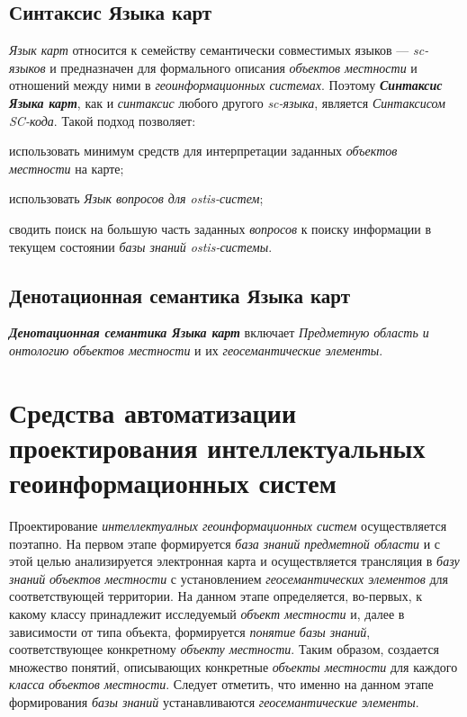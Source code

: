 \subsection{Синтаксис Языка карт}
\label{chapter_gis_sec_map_syntax}

\textit{Язык карт} относится к семейству семантически совместимых языков --- \textit{sc-языков} и предназначен для формального описания \textit{объектов местности} и отношений между ними в \textit{геоинформационных системах}. Поэтому \textbf{\textit{Синтаксис Языка карт}}, как и \textit{синтаксис} любого другого \textit{sc-языка}, является \textit{Синтаксисом SC-кода}. Такой подход позволяет:
\begin{textitemize}
\item использовать минимум средств для интерпретации заданных \textit{объектов местности} на карте;
\item использовать \textit{Язык вопросов для ostis-систем};
\item сводить поиск на большую часть заданных \textit{вопросов} к поиску информации в текущем состоянии \textit{базы знаний ostis-системы}.
\end{textitemize}

\subsection{Денотационная семантика Языка карт}
\label{chapter_gis_sec_map_semantics}

\textbf{\textit{Денотационная семантика Языка карт}} включает \textit{Предметную область и онтологию объектов местности} и их \textit{геосемантические элементы}.

\section{Средства автоматизации проектирования интеллектуальных геоинформационных систем}
\label{chapter_gis_sec_automatization}

Проектирование \textit{интеллектуалных геоинформационных систем} осуществляется поэтапно. На первом этапе формируется \textit{база знаний} \textit{предметной области} и с этой целью анализируется электронная карта и осуществляется трансляция в \textit{базу знаний} \textit{объектов местности} с установлением \textit{геосемантических элементов} для соответствующей территории. На данном этапе определяется, во-первых, к какому классу принадлежит исследуемый \textit{объект местности} и, далее в зависимости от типа объекта, формируется \textit{понятие} \textit{базы знаний}, соответствующее конкретному \textit{объекту местности}. Таким образом, создается множество понятий, описывающих конкретные \textit{объекты местности} для каждого \textit{класса объектов местности\scnsupergroupsign}. Следует отметить, что именно на данном этапе формирования \textit{базы знаний} устанавливаются \textit{геосемантические элементы}.

